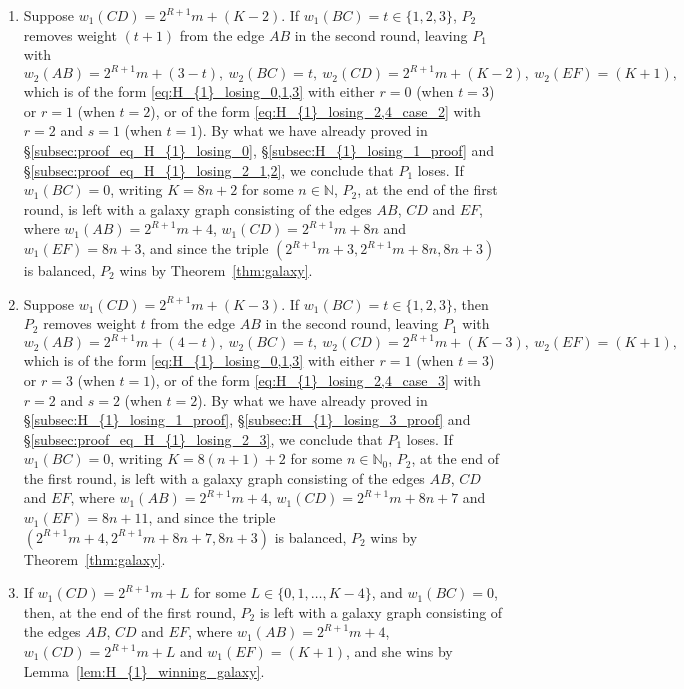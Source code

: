 \documentclass[11pt,reqno]{amsart}
\theoremstyle{definition}
\theoremstyle{definition}
\begin{document}
\begin{enumerate}
\begin{enumerate}
\item Suppose $w_{1}(CD)=2^{R+1}m+(K-2)$. If $w_{1}(BC)=t \in \{1,2,3\}$, $P_{2}$ removes weight $(t+1)$ from the edge $AB$ in the second round, leaving $P_{1}$ with 
\begin{equation}
w_{2}(AB)=2^{R+1}m+(3-t),\ w_{2}(BC)=t,\ w_{2}(CD)=2^{R+1}m+(K-2),\ w_{2}(EF)=(K+1),\nonumber
\end{equation}
which is of the form \eqref{eq:H_{1}_losing_0,1,3} with either $r=0$ (when $t=3$) or $r=1$ (when $t=2$), or of the form \eqref{eq:H_{1}_losing_2,4_case_2} with $r=2$ and $s=1$ (when $t=1$). By what we have already proved in \S\ref{subsec:proof_eq_H_{1}_losing_0}, \S\ref{subsec:H_{1}_losing_1_proof} and \S\ref{subsec:proof_eq_H_{1}_losing_2_1,2}, we conclude that $P_{1}$ loses. If $w_{1}(BC)=0$, writing $K=8n+2$ for some $n\in\mathbb{N}$, $P_{2}$, at the end of the first round, is left with a galaxy graph consisting of the edges $AB$, $CD$ and $EF$, where $w_{1}(AB)=2^{R+1}m+4$, $w_{1}(CD)=2^{R+1}m+8n$ and $w_{1}(EF)=8n+3$, and since the triple $(2^{R+1}m+3,2^{R+1}m+8n,8n+3)$ is balanced, $P_{2}$ wins by Theorem~\ref{thm:galaxy}.

\item Suppose $w_{1}(CD)=2^{R+1}m+(K-3)$. If $w_{1}(BC)=t \in \{1,2,3\}$, then $P_{2}$ removes weight $t$ from the edge $AB$ in the second round, leaving $P_{1}$ with 
\begin{equation}
w_{2}(AB)=2^{R+1}m+(4-t),\ w_{2}(BC)=t,\ w_{2}(CD)=2^{R+1}m+(K-3),\ w_{2}(EF)=(K+1),\nonumber
\end{equation} 
which is of the form \eqref{eq:H_{1}_losing_0,1,3} with either $r=1$ (when $t=3$) or $r=3$ (when $t=1$), or of the form \eqref{eq:H_{1}_losing_2,4_case_3} with $r=2$ and $s=2$ (when $t=2$). By what we have already proved in \S\ref{subsec:H_{1}_losing_1_proof}, \S\ref{subsec:H_{1}_losing_3_proof} and \S\ref{subsec:proof_eq_H_{1}_losing_2_3}, we conclude that $P_{1}$ loses. If $w_{1}(BC)=0$, writing $K=8(n+1)+2$ for some $n\in\mathbb{N}_{0}$, $P_{2}$, at the end of the first round, is left with a galaxy graph consisting of the edges $AB$, $CD$ and $EF$, where $w_{1}(AB)=2^{R+1}m+4$, $w_{1}(CD)=2^{R+1}m+8n+7$ and $w_{1}(EF)=8n+11$, and since the triple $(2^{R+1}m+4,2^{R+1}m+8n+7,8n+3)$ is balanced, $P_{2}$ wins by Theorem~\ref{thm:galaxy}.

\item If $w_{1}(CD)=2^{R+1}m+L$ for some $L \in \{0,1,\ldots,K-4\}$, and $w_{1}(BC)=0$, then, at the end of the first round, $P_{2}$ is left with a galaxy graph consisting of the edges $AB$, $CD$ and $EF$, where $w_{1}(AB)=2^{R+1}m+4$, $w_{1}(CD)=2^{R+1}m+L$ and $w_{1}(EF)=(K+1)$, and she wins by Lemma~\ref{lem:H_{1}_winning_galaxy}.


\end{enumerate}
\end{enumerate}
\end{document}
